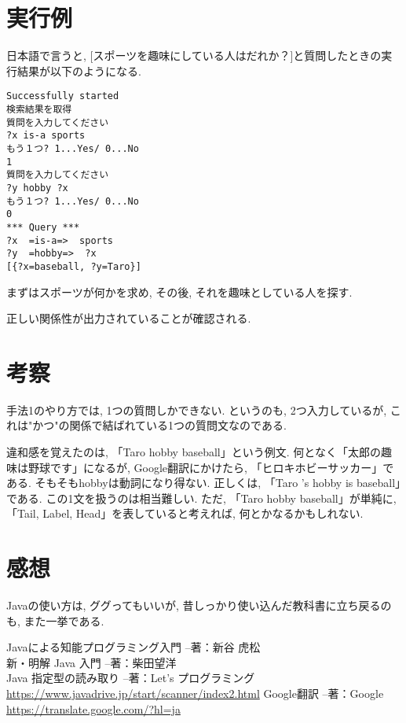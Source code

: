 \documentclass[uplatex,12pt]{jsarticle}
\begin{document}
\section{実行例}
日本語で言うと, [スポーツを趣味にしている人はだれか？]と質問したときの実行結果が以下のようになる.
\begin{lstlisting}
Successfully started
検索結果を取得
質問を入力してください
?x is-a sports
もう１つ? 1...Yes/ 0...No
1
質問を入力してください
?y hobby ?x
もう１つ? 1...Yes/ 0...No
0
*** Query ***
?x  =is-a=>  sports
?y  =hobby=>  ?x
[{?x=baseball, ?y=Taro}]
\end{lstlisting}

まずはスポーツが何かを求め, その後, それを趣味としている人を探す.

正しい関係性が出力されていることが確認される.\\

\section{考察}
手法1のやり方では, 1つの質問しかできない. というのも, 2つ入力しているが, これは"かつ"の関係で結ばれている1つの質問文なのである.

違和感を覚えたのは, 「Taro hobby baseball」という例文. 何となく「太郎の趣味は野球です」になるが, Google翻訳にかけたら, 「ヒロキホビーサッカー」である. そもそもhobbyは動詞になり得ない. 正しくは, 「Taro ’s hobby is baseball」である. この1文を扱うのは相当難しい. ただ, 「Taro hobby baseball」が単純に, 「Tail, Label, Head」を表していると考えれば, 何とかなるかもしれない.

\section{感想}
Javaの使い方は, ググってもいいが, 昔しっかり使い込んだ教科書に立ち戻るのも, また一挙である.

\begin{thebibliography}{99}
 Javaによる知能プログラミング入門 --著：新谷 虎松 \\
 新・明解 Java 入門 --著：柴田望洋 \\
 Java 指定型の読み取り --著：Let's プログラミング \\
\url{https://www.javadrive.jp/start/scanner/index2.html}
 Google翻訳 --著：Google \\
\url{https://translate.google.com/?hl=ja}
\end{thebibliography}
\end{document}
